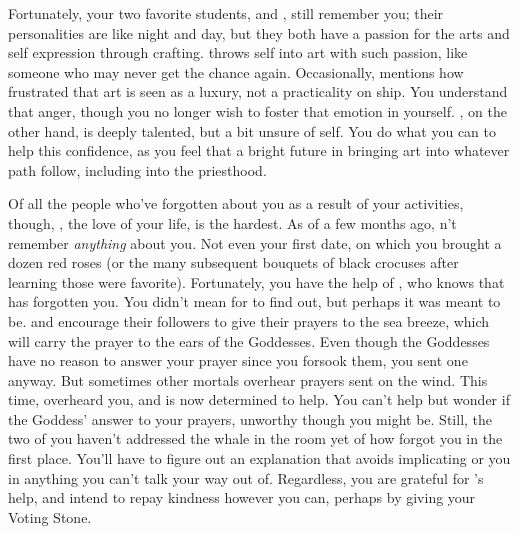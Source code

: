 \documentclass[char]{GL2020}
\begin{document}
Fortunately, your two favorite students, \cPirateChild{\full} and \cInitiate{\full}, still remember you; their personalities are like night and day, but they both have a passion for the arts and self expression through crafting. \cPirateChild{} throws \cPirateChild{\them}self into art with such passion, like someone who may never get the chance again. Occasionally, \cPirateChild{} mentions how frustrated \cPirateChild{\they} \cPirateChild{\are} that art is seen as a luxury, not a practicality on \cPirateChild{\their} ship. You understand that anger, though you no longer wish to foster that emotion in yourself. \cInitiate{}, on the other hand, is deeply talented, but a bit unsure of \cInitiate{\them}self. You do what you can to help this confidence, as you feel that \cInitiate{\they} \cInitiate{\have} a bright future in bringing art into whatever path \cIntiatiate{\they} follow, including into the priesthood.

Of all the people who've forgotten about you as a result of your activities, though, \cHeadScientist{}, the love of your life, is the hardest. As of a few months ago, \cHeadScientist{\they} \cHeadScientist{\do}n't remember \emph{anything} about you. Not even your first date, on which you brought \cHeadScientist{\them} a dozen red roses (or the many subsequent bouquets of black crocuses after learning those were \cHeadScientist{\their} favorite). Fortunately, you have the help of \cInitiate{}, who knows that \cHeadScientist{} has forgotten you. You didn't mean for \cInitiate{} to find out, but perhaps it was meant to be. \cEbb{} and \cFlow{} encourage their followers to give their prayers to the sea breeze, which will carry the prayer to the ears of the Goddesses. Even though the Goddesses have no reason to answer your prayer since you forsook them, you sent one anyway. But sometimes other mortals overhear prayers sent on the wind. This time, \cInitiate{} overheard you, and is now determined to help. You can't help but wonder if \cInitiate{\they} \cInitiate{\are} the Goddess' answer to your prayers, unworthy though you might be. Still, the two of you haven't addressed the whale in the room yet of how \cHeadScientist{} forgot you in the first place. You'll have to figure out an explanation that avoids implicating \cHeadScientist{} or you in anything you can't talk your way out of. Regardless, you are grateful for \cInitiate{}'s help, and intend to repay \cInitiate{\their} kindness however you can, perhaps by giving \cInitiate{\them} your Voting Stone.
\end{document}
